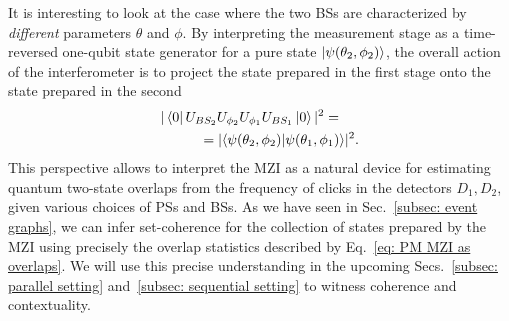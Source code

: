 \documentclass[letterpaper,onecolumn,12pt,accepted=2024-01-17]{article}
\begin{document}
It is interesting to look at the case where the two BSs are characterized by \textit{different} parameters $\theta$ and $\phi$. By interpreting the measurement stage as a time-reversed one-qubit state generator for a pure state $\ket{\psi(\theta_2,\phi_2)}$, the overall action of the interferometer is to project the state prepared in the first stage onto the state prepared in the second
\begin{align}
    |\bra{0} U_{BS_{2}}U_{\phi_2}U_{\phi_1}U_{BS_1}\ket{0}|^2 =\hspace{0.5cm}\nonumber\\= |\langle \psi(\theta_2,\phi_2)\vert \psi(\theta_1,\phi_1) \rangle|^2.\label{eq: PM MZI as overlaps}
\end{align}
This perspective allows to interpret the MZI as a natural device for estimating quantum two-state overlaps from the frequency of clicks in the detectors $D_1, D_2$, given various choices of PSs and BSs. { As we have seen in Sec.~\ref{subsec: event graphs}, we can infer set-coherence for the collection of states prepared by the MZI using precisely the overlap statistics described by Eq.~\eqref{eq: PM MZI as overlaps}. We will use this precise understanding in the upcoming Secs.~\ref{subsec: parallel setting} and~\ref{subsec: sequential setting} to witness coherence and contextuality.}
\end{document}
